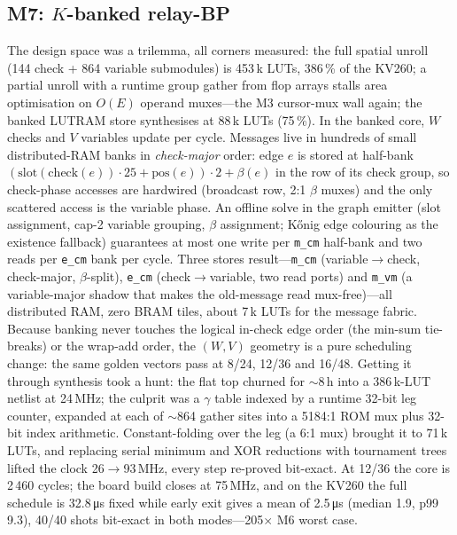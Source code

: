 \subsection*{M7: $K$-banked relay-BP}
The design space was a trilemma, all corners measured: the full spatial
unroll (144 check + 864 variable submodules) is 453\,k LUTs, 386\,\% of the
KV260; a partial unroll with a runtime group gather from flop arrays stalls
area optimisation on $O(E)$ operand muxes---the M3 cursor-mux wall again;
the banked LUTRAM store synthesises at 88\,k LUTs (75\,\%).
In the banked core, $W$ checks and $V$ variables update per cycle. Messages
live in hundreds of small distributed-RAM banks in \emph{check-major}
order: edge $e$ is stored at half-bank
$(\mathrm{slot}(\mathrm{check}(e))\cdot 25+\mathrm{pos}(e))\cdot 2+\beta(e)$
in the row of its check group, so check-phase accesses are hardwired
(broadcast row, 2:1 $\beta$ muxes) and the only scattered access is the
variable phase. An offline solve in the graph emitter (slot assignment,
cap-2 variable grouping, $\beta$ assignment; K\H{o}nig edge colouring as the
existence fallback) guarantees at most one write per \texttt{m\_cm}
half-bank and two reads per \texttt{e\_cm} bank per cycle. Three stores
result---\texttt{m\_cm} (variable$\to$check, check-major, $\beta$-split),
\texttt{e\_cm} (check$\to$variable, two read ports) and \texttt{m\_vm}
(a variable-major shadow that makes the old-message read mux-free)---all
distributed RAM, zero BRAM tiles, about 7\,k LUTs for the message fabric.
Because banking never touches the logical in-check edge order (the
min-sum tie-breaks) or the wrap-add order, the $(W,V)$ geometry is a pure
scheduling change: the same golden vectors pass at 8/24, 12/36 and 16/48.
Getting it through synthesis took a hunt: the flat top churned for
$\sim$8\,h into a 386\,k-LUT netlist at 24\,MHz; the culprit was a
$\gamma$ table indexed by a runtime 32-bit leg counter, expanded at each of
$\sim$864 gather sites into a 5184:1 ROM mux plus 32-bit index arithmetic.
Constant-folding over the leg (a 6:1 mux) brought it to 71\,k LUTs, and
replacing serial minimum and XOR reductions with tournament trees lifted
the clock 26$\to$93\,MHz, every step re-proved bit-exact.
At 12/36 the core is 2\,460 cycles; the board build closes at 75\,MHz, and
on the KV260 the full schedule is 32.8\,\si{\micro\second} fixed while
early exit gives a mean of 2.5\,\si{\micro\second} (median 1.9, p99 9.3),
40/40 shots bit-exact in both modes---205$\times$ M6 worst case.

